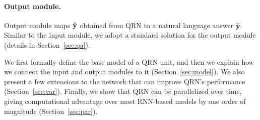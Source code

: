 \documentclass[table]{article}
\begin{document}
\paragraph{Output module.}
Output module maps $\hat{\bf y}$ obtained from QRN to a natural language answer $\hat{\bm y}$. 
Similar to the input module, we adopt a standard solution for the output module (details in Section~\ref{sec:qa}).


We first formally define the base model of a QRN unit, and then we explain how we connect the input and output modules to it (Section~\ref{sec:model}).
We also present a few extensions to the network that can improve QRN's performance (Section~\ref{sec:var}).
Finally, we show that QRN can be parallelized over time, giving computational advantage over most RNN-based models by one order of magnitude (Section~\ref{sec:par}).
\end{document}
